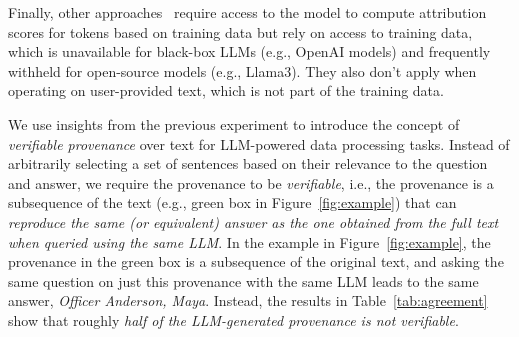 Finally, other approaches~\cite{lee2025llm} 
require access to the model to compute attribution scores
for tokens based on training data but rely on access to training data, which 
is unavailable for black-box LLMs (e.g., OpenAI models) and frequently withheld for open-source models (e.g., Llama3). 
They also don't apply when operating on user-provided text, which is not part of the training data. 


We use insights from the previous experiment
to introduce the concept of {\em verifiable provenance} over text  
for LLM-powered data processing tasks.
Instead of arbitrarily selecting a set of sentences 
based on their relevance to the question and answer, 
we require the provenance to be {\em verifiable}, 
i.e., the provenance is a subsequence of the text (e.g., green box in Figure~\ref{fig:example}) 
that can {\em reproduce the same (or equivalent) 
answer as the one obtained from the full text when queried using the same LLM}. 
In the example in Figure~\ref{fig:example}, 
the provenance in the green box 
is a subsequence of the original text, 
and asking the same question on just this provenance with the same LLM  
leads to the same answer, {\em Officer Anderson, Maya}. 
Instead, the results in Table~\ref{tab:agreement} 
show that roughly {\em half of the LLM-generated provenance is not verifiable}. 

